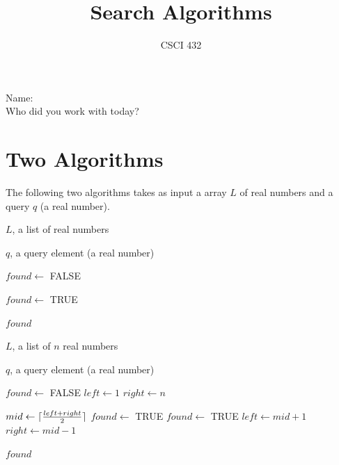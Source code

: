 \documentclass{article}
\title{Search Algorithms}
\author{CSCI 432}
\begin{document}
\maketitle

\noindent
Name:\\
Who did you work with today?

\section*{Two Algorithms}

The following two algorithms takes as input a array $L$ of real numbers
and a query $q$ (a real number).

\begin{minipage}{0.46\textwidth}
\begin{algorithm}[H]
    \caption{Search I}
    \begin{algorithmic}[1]
        \REQUIRE $L$, a list of real numbers

        \ENSURE $q$, a query element (a real number)

        \STATE $found \gets$ FALSE

                \STATE $found \gets$ TRUE
            \ENDIF
        \ENDFOR

        \RETURN $found$

    \end{algorithmic}
\end{algorithm}
\end{minipage}%
\hfill%
\begin{minipage}{0.46\textwidth}
\begin{algorithm}[H]
    \caption{Search II}
    \begin{algorithmic}[1]
        \REQUIRE $L$, a list of $n$ real numbers

        \ENSURE $q$, a query element (a real number)

        \STATE $found \gets$ FALSE
        \STATE $left \gets 1$
        \STATE $right \gets n$

            \STATE $mid \gets \lceil {\frac{left + right}{2}} \rceil$
                \STATE $found \gets$ TRUE
            \ENDIF
                \STATE $found \gets$ TRUE
                \STATE $left \gets mid+1$
            \ELSE
                \STATE $right \gets mid-1$
            \ENDIF
        \ENDWHILE

        \RETURN $found$

    \end{algorithmic}
\end{algorithm}
\end{minipage}
\end{document}
